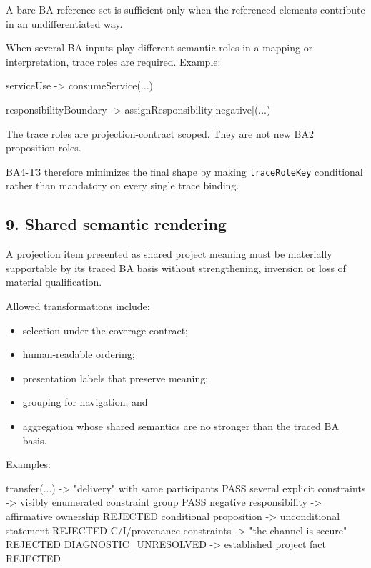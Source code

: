 \documentclass[
  11pt,
  a4paper,
]{article}
\newenvironment{Shaded}{}{}
\newcommand{\NormalTok}[1]{#1}
\providecommand{\tightlist}{%
  \setlength{\itemsep}{0pt}\setlength{\parskip}{0pt}}
\begin{document}
A bare BA reference set is sufficient only when the referenced elements
contribute in an undifferentiated way.

When several BA inputs play different semantic roles in a mapping or
interpretation, trace roles are required. Example:

\begin{Shaded}
\begin{Highlighting}[]
\NormalTok{serviceUse}
\NormalTok{  {-}\textgreater{} consumeService(...)}

\NormalTok{responsibilityBoundary}
\NormalTok{  {-}\textgreater{} assignResponsibility[negative](...)}
\end{Highlighting}
\end{Shaded}

The trace roles are projection-contract scoped. They are not new BA2
proposition roles.

BA4-T3 therefore minimizes the final shape by making
\texttt{traceRoleKey} conditional rather than mandatory on every single
trace binding.

\subsection{9. Shared semantic
rendering}\label{shared-semantic-rendering}

A projection item presented as shared project meaning must be materially
supportable by its traced BA basis without strengthening, inversion or
loss of material qualification.

Allowed transformations include:

\begin{itemize}
\tightlist
\item
  selection under the coverage contract;
\item
  human-readable ordering;
\item
  presentation labels that preserve meaning;
\item
  grouping for navigation; and
\item
  aggregation whose shared semantics are no stronger than the traced BA
  basis.
\end{itemize}

Examples:

\begin{Shaded}
\begin{Highlighting}[]
\NormalTok{transfer(...) {-}\textgreater{} "delivery" with same participants                 PASS}
\NormalTok{several explicit constraints {-}\textgreater{} visibly enumerated constraint group PASS}
\NormalTok{negative responsibility {-}\textgreater{} affirmative ownership                    REJECTED}
\NormalTok{conditional proposition {-}\textgreater{} unconditional statement                  REJECTED}
\NormalTok{C/I/provenance constraints {-}\textgreater{} "the channel is secure"               REJECTED}
\NormalTok{DIAGNOSTIC\_UNRESOLVED {-}\textgreater{} established project fact                    REJECTED}
\end{Highlighting}
\end{Shaded}
\end{document}
